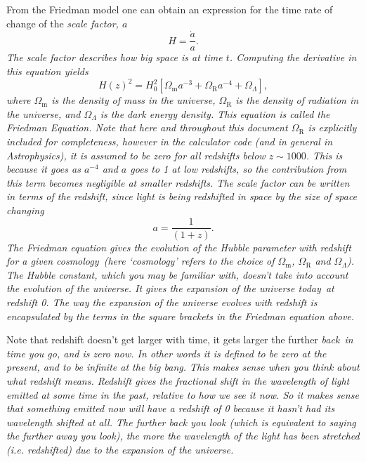 \documentclass[]{article}
\begin{document}
\noindent From the Friedman model one can obtain an expression for the time rate of change of the \itshape scale factor\upshape, $a$
\begin{equation}
H = \frac{\dot a}{a}.
\end{equation}
The scale factor describes how big space is at time $t$. Computing the derivative in this equation yields
\begin{equation}
H(z)^2 = H_0^2[\Omega_\mathrm{m} a^{-3}+\Omega_\mathrm{R} a^{-4}+\Omega_\Lambda],
\end{equation}
\noindent where $\Omega_\mathrm{m}$ is the density of mass in the universe, $\Omega_\mathrm{R}$ is the density of radiation in the universe, and $\Omega_\Lambda$ is the dark energy density. This equation is called the Friedman Equation. Note that here and throughout this document $\Omega_\mathrm{R}$ is explicitly included for completeness, however in the calculator code (and in general in Astrophysics), it is assumed to be zero for all redshifts below $z\sim1000$. This is because it goes as $a^{-4}$ and $a$ goes to 1 at low redshifts, so the contribution from this term becomes negligible at smaller redshifts. The scale factor can be written in terms of the redshift, since light is being redshifted in space by the size of space changing
\begin{equation}
a = \frac{1}{(1+z)}.
\end{equation}
The Friedman equation gives the evolution of the Hubble parameter with redshift for a given \itshape cosmology~\upshape (here ‘cosmology’ refers to the choice of $\Omega_\mathrm{m}$, $\Omega_\mathrm{R}$ and $\Omega_\Lambda$). The Hubble \itshape constant\upshape , which you may be familiar with, doesn't take into account the evolution of the universe. It gives the expansion of the universe \itshape today~\upshape at redshift 0. The way the expansion of the universe evolves with redshift is encapsulated by the terms in the square brackets in the Friedman equation above. 

\noindent Note that redshift doesn't get larger with time, it gets larger the further \itshape back~\upshape in time you go, and is zero now. In other words it is defined to be zero at the present, and to be infinite at the big bang. This makes sense when you think about what redshift means. Redshift gives the fractional shift in the wavelength of light emitted at some time in the past, relative to how we see it now. So it makes sense that something emitted now will have a redshift of 0 because it hasn't had its wavelength shifted at all. The further back you look (which is equivalent to saying the further away you look), the more the wavelength of the light has been stretched (i.e. redshifted) due to the expansion of the universe. \\
\end{document}
